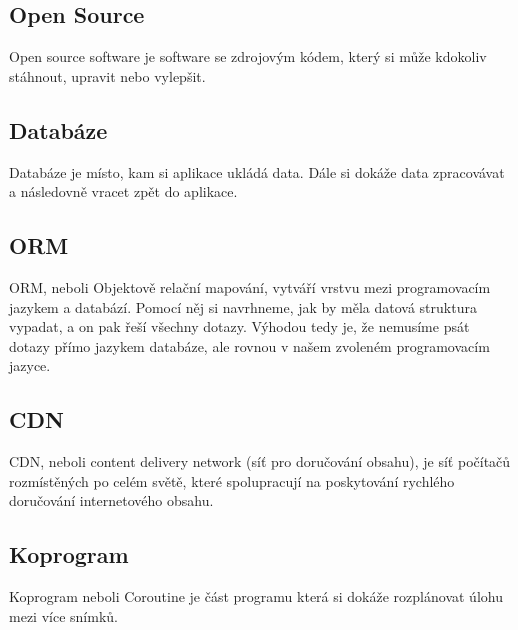 \subsection{Open Source}
Open source software je software se zdrojovým kódem, který si může kdokoliv stáhnout, upravit nebo vylepšit. \cite{OpenSource}

\subsection{Databáze}
Databáze je místo, kam si aplikace ukládá data. Dále si dokáže data zpracovávat a následovně vracet zpět do aplikace.

\subsection{ORM}
ORM, neboli Objektově relační mapování, vytváří vrstvu mezi programovacím jazykem a databází. Pomocí něj si navrhneme, jak by měla datová struktura vypadat, a on pak řeší všechny dotazy. Výhodou tedy je, že nemusíme psát dotazy přímo jazykem databáze, ale rovnou v našem zvoleném programovacím jazyce.

\subsection{CDN}
CDN, neboli content delivery network (síť pro doručování obsahu), je síť počítačů rozmístěných po celém světě, které spolupracují na poskytování rychlého doručování internetového obsahu.\cite{CDN}

\subsection{Koprogram}
Koprogram neboli Coroutine je část programu která si dokáže rozplánovat úlohu mezi více snímků.\cite{Coroutine} 
